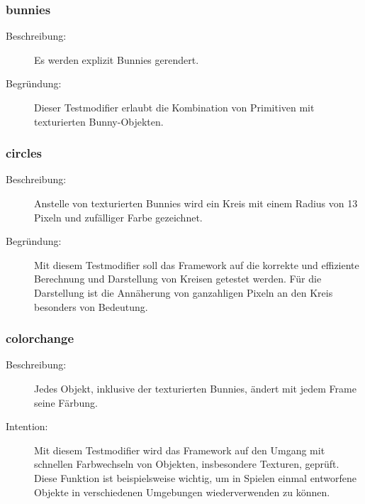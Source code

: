 \subsubsection{bunnies}
\begin{description}
\item[Beschreibung:] Es werden explizit Bunnies gerendert. \\
\item[Begründung:] Dieser Testmodifier erlaubt die Kombination von Primitiven mit texturierten Bunny-Objekten. 
\end{description} 

\subsubsection{circles}
\begin{description}
\item[Beschreibung:] Anstelle von texturierten Bunnies wird ein Kreis mit einem Radius von 13 Pixeln und zufälliger Farbe gezeichnet. \\
\item[Begründung:] Mit diesem Testmodifier soll das Framework auf die korrekte und effiziente Berechnung und Darstellung von Kreisen getestet werden. Für die Darstellung ist die Annäherung von ganzahligen Pixeln an den Kreis besonders von Bedeutung.
\end{description} 

\subsubsection{colorchange}
\begin{description}
\item[Beschreibung:] Jedes Objekt, inklusive der texturierten Bunnies, ändert mit jedem Frame seine Färbung. \\
\item[Intention:] Mit diesem Testmodifier wird das Framework auf den Umgang mit schnellen Farbwechseln von Objekten, insbesondere Texturen, geprüft. Diese Funktion ist beispielsweise wichtig, um in Spielen einmal entworfene Objekte in verschiedenen Umgebungen wiederverwenden zu können.
\end{description} 

